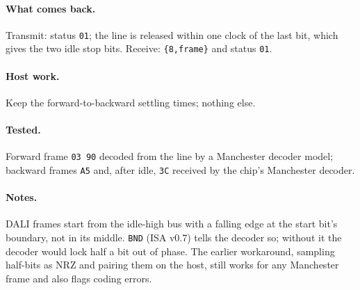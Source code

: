 \documentclass[11pt,a4paper]{article}
\newcommand{\sig}[1]{\texttt{#1}}
\begin{document}
\paragraph{What comes back.} Transmit: status \texttt{01}; the line is released within one clock of the last bit, which gives the two idle stop bits. Receive: \texttt{\{8,frame\}} and status \texttt{01}.

\paragraph{Host work.} Keep the forward-to-backward settling times; nothing else.

\paragraph{Tested.} Forward frame \texttt{03 90} decoded from the line by a Manchester decoder model; backward frames \texttt{A5} and, after idle, \texttt{3C} received by the chip's Manchester decoder.
\paragraph{Notes.} DALI frames start from the idle-high bus with a falling edge at the start bit's boundary, not in its middle. \sig{BND} (ISA v0.7) tells the decoder so; without it the decoder would lock half a bit out of phase. The earlier workaround, sampling half-bits as NRZ and pairing them on the host, still works for any Manchester frame and also flags coding errors.
\end{document}
